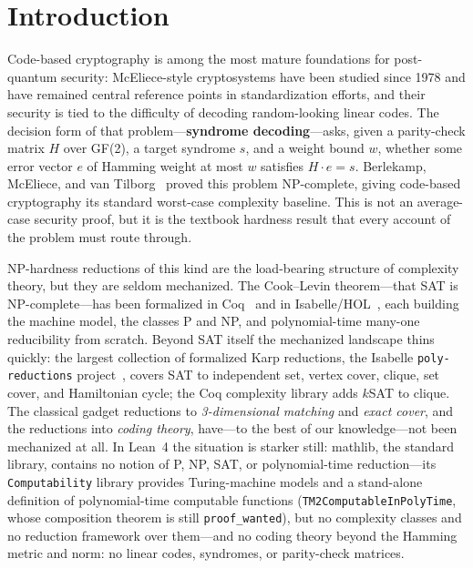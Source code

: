 \documentclass[sigplan,review,anonymous]{acmart}
\begin{document}
\section{Introduction}\label{sec:intro}

Code-based cryptography is among the most mature foundations for post-quantum security: McEliece-style
cryptosystems have been studied since 1978 and have remained central reference points in standardization
efforts, and their security is tied to the difficulty of decoding random-looking linear codes. The decision
form of that problem---\textbf{syndrome decoding}---asks, given a parity-check matrix $H$ over GF(2), a target
syndrome $s$, and a weight bound $w$, whether some error vector $e$ of Hamming weight at most $w$ satisfies
$H \cdot e = s$. Berlekamp, McEliece, and van Tilborg~\cite{BMvT78} proved this problem NP-complete, giving
code-based cryptography its standard worst-case complexity baseline. This is not an average-case security proof,
but it is the textbook hardness result that every account of the problem must route through.

NP-hardness reductions of this kind are the load-bearing structure of complexity theory, but they are seldom
mechanized. The Cook--Levin theorem---that SAT is NP-complete---has been formalized in Coq~\cite{GK21} and in
Isabelle/HOL~\cite{Bal23}, each building the machine model, the classes P and NP, and polynomial-time many-one
reducibility from scratch. Beyond SAT itself the mechanized landscape thins quickly: the largest collection of
formalized Karp reductions, the Isabelle \lstinline{poly-reductions} project~\cite{PolyRed}, covers SAT to
independent set, vertex cover, clique, set cover, and Hamiltonian cycle; the Coq complexity library adds
$k$SAT to clique. The classical gadget reductions to \emph{3-dimensional matching} and \emph{exact cover}, and
the reductions into \emph{coding theory}, have---to the best of our knowledge---not been mechanized at all. In
Lean~4 the situation is starker still: mathlib, the standard library, contains no notion of P, NP, SAT, or
polynomial-time reduction---its \lstinline{Computability} library provides Turing-machine models and a
stand-alone definition of polynomial-time computable functions (\lstinline{TM2ComputableInPolyTime}, whose
composition theorem is still \lstinline{proof_wanted}), but no complexity classes and no reduction framework
over them---and no coding theory beyond the Hamming metric and norm: no linear codes, syndromes, or
parity-check matrices.
\end{document}
